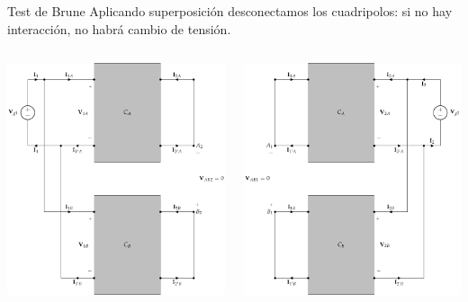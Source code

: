 \documentclass[xcolor={usenames,svgnames,dvipsnames}]{beamer}
\begin{document}
\begin{frame}[label={sec:org54eecf6},plain]{Test de Brune}
Aplicando superposición desconectamos los cuadripolos: \alert{si no hay interacción, no habrá cambio de tensión}.
\begin{columns}
\begin{column}{0.65\columnwidth}
\begin{center}
\includegraphics[width=.9\linewidth]{figs/paralelo-paralelo-brune-entrada2.pdf}
\end{center}
\end{column}
\begin{column}{0.65\columnwidth}
\begin{center}
\includegraphics[width=.9\linewidth]{figs/paralelo-paralelo-brune-salida2.pdf}
\end{center}
\end{column}
\end{columns}
\end{frame}
\end{document}
